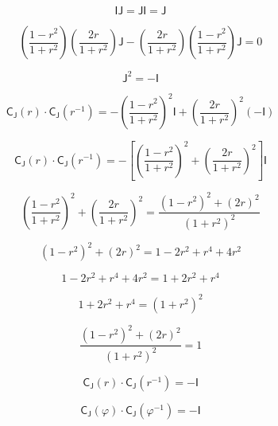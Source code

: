 \documentclass[12pt]{article}
\begin{document}
\begin{equation}
\mathsf{I}\mathsf{J}=\mathsf{J}\mathsf{I}=\mathsf{J}
\end{equation}

\begin{equation}
\left(\frac{1-r^2}{1+r^2}\right)\!\left(\frac{2r}{1+r^2}\right)\mathsf{J}
-\left(\frac{2r}{1+r^2}\right)\!\left(\frac{1-r^2}{1+r^2}\right)\mathsf{J}=0
\end{equation}

\begin{equation}
\mathsf{J}^2=-\mathsf{I}
\end{equation}

\begin{equation}
\mathsf{C}_{\mathsf{J}}(r)\cdot\mathsf{C}_{\mathsf{J}}(r^{-1})
=
-\left(\frac{1-r^2}{1+r^2}\right)^{\!2}\mathsf{I}
+\left(\frac{2r}{1+r^2}\right)^{\!2}(-\mathsf{I})
\end{equation}

\begin{equation}
\mathsf{C}_{\mathsf{J}}(r)\cdot\mathsf{C}_{\mathsf{J}}(r^{-1})
=
-\left[\left(\frac{1-r^2}{1+r^2}\right)^{\!2}+\left(\frac{2r}{1+r^2}\right)^{\!2}\right]\mathsf{I}
\end{equation}

\begin{equation}
\left(\frac{1-r^2}{1+r^2}\right)^{\!2}+\left(\frac{2r}{1+r^2}\right)^{\!2}
=\frac{(1-r^2)^2+(2r)^2}{(1+r^2)^2}
\end{equation}

\begin{equation}
(1-r^2)^2+(2r)^2=1-2r^2+r^4+4r^2
\end{equation}

\begin{equation}
1-2r^2+r^4+4r^2=1+2r^2+r^4
\end{equation}

\begin{equation}
1+2r^2+r^4=(1+r^2)^2
\end{equation}

\begin{equation}
\frac{(1-r^2)^2+(2r)^2}{(1+r^2)^2}=1
\end{equation}

\begin{equation}
\mathsf{C}_{\mathsf{J}}(r)\cdot\mathsf{C}_{\mathsf{J}}(r^{-1})=-\mathsf{I}
\end{equation}

\begin{equation}
\mathsf{C}_{\mathsf{J}}(\varphi)\cdot\mathsf{C}_{\mathsf{J}}(\varphi^{-1})=-\mathsf{I}
\end{equation}
\end{document}
